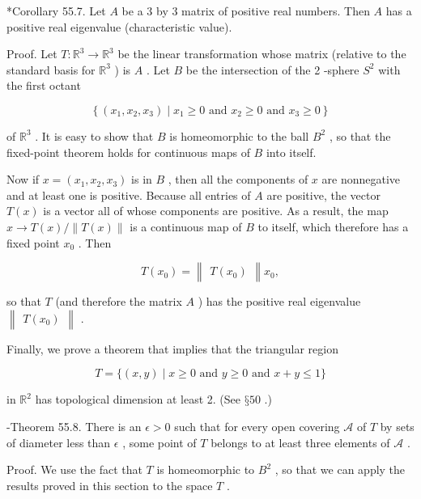 *Corollary 55.7. Let \(A\) be a 3 by 3 matrix of positive real numbers. Then \(A\) has a positive real eigenvalue (characteristic value).

Proof. Let \(T : {\mathbb{R}}^{3} \rightarrow  {\mathbb{R}}^{3}\) be the linear transformation whose matrix (relative to the standard basis for \({\mathbb{R}}^{3}\) ) is \(A\) . Let \(B\) be the intersection of the 2 -sphere \({S}^{2}\) with the first octant

\[
\left\{  {\left( {{x}_{1},{x}_{2},{x}_{3}}\right)  \mid  {x}_{1} \geq  0\text{ and }{x}_{2} \geq  0\text{ and }{x}_{3} \geq  0}\right\}
\]

of \({\mathbb{R}}^{3}\) . It is easy to show that \(B\) is homeomorphic to the ball \({B}^{2}\) , so that the fixed-point theorem holds for continuous maps of \(B\) into itself.

Now if \(x = \left( {{x}_{1},{x}_{2},{x}_{3}}\right)\) is in \(B\) , then all the components of \(x\) are nonnegative and at least one is positive. Because all entries of \(A\) are positive, the vector \(T\left( x\right)\) is a vector all of whose components are positive. As a result, the map \(x \rightarrow  T\left( x\right) /\parallel T\left( x\right) \parallel\) is a continuous map of \(B\) to itself, which therefore has a fixed point \({x}_{0}\) . Then

\[
T\left( {x}_{0}\right)  = \begin{Vmatrix}{T\left( {x}_{0}\right) }\end{Vmatrix}{x}_{0},
\]

so that \(T\) (and therefore the matrix \(A\) ) has the positive real eigenvalue \(\begin{Vmatrix}{T\left( {x}_{0}\right) }\end{Vmatrix}\) .

Finally, we prove a theorem that implies that the triangular region

\[
T = \{ \left( {x,y}\right)  \mid  x \geq  0\text{ and }y \geq  0\text{ and }x + y \leq  1\}
\]

in \({\mathbb{R}}^{2}\) has topological dimension at least 2. (See \(§{50}\) .)

-Theorem 55.8. There is an \(\epsilon  > 0\) such that for every open covering \(\mathcal{A}\) of \(T\) by sets of diameter less than \(\epsilon\) , some point of \(T\) belongs to at least three elements of \(\mathcal{A}\) .

Proof. We use the fact that \(T\) is homeomorphic to \({B}^{2}\) , so that we can apply the results proved in this section to the space \(T\) .

